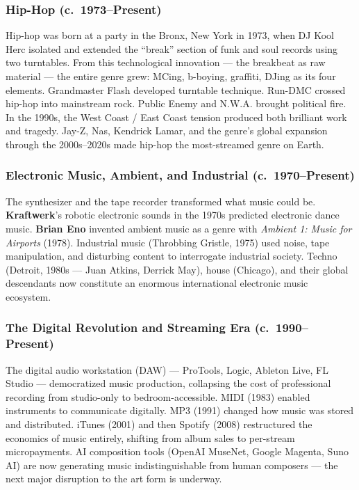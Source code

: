 \documentclass[11pt,letterpaper]{article}
\begin{document}
\subsubsection{Hip-Hop (c.~1973--Present)}

Hip-hop was born at a party in the Bronx, New York in 1973, when DJ Kool Herc isolated and extended the ``break'' section of funk and soul records using two turntables. From this technological innovation --- the breakbeat as raw material --- the entire genre grew: MCing, b-boying, graffiti, DJing as its four elements. Grandmaster Flash developed turntable technique. Run-DMC crossed hip-hop into mainstream rock. Public Enemy and N.W.A. brought political fire. In the 1990s, the West Coast / East Coast tension produced both brilliant work and tragedy. Jay-Z, Nas, Kendrick Lamar, and the genre's global expansion through the 2000s--2020s made hip-hop the most-streamed genre on Earth.

\subsubsection{Electronic Music, Ambient, and Industrial (c.~1970--Present)}

The synthesizer and the tape recorder transformed what music could be. \textbf{Kraftwerk}'s robotic electronic sounds in the 1970s predicted electronic dance music. \textbf{Brian Eno} invented ambient music as a genre with \emph{Ambient 1: Music for Airports} (1978). Industrial music (Throbbing Gristle, 1975) used noise, tape manipulation, and disturbing content to interrogate industrial society. Techno (Detroit, 1980s --- Juan Atkins, Derrick May), house (Chicago), and their global descendants now constitute an enormous international electronic music ecosystem.

\subsubsection{The Digital Revolution and Streaming Era (c.~1990--Present)}

The digital audio workstation (DAW) --- ProTools, Logic, Ableton Live, FL Studio --- democratized music production, collapsing the cost of professional recording from studio-only to bedroom-accessible. MIDI (1983) enabled instruments to communicate digitally. MP3 (1991) changed how music was stored and distributed. iTunes (2001) and then Spotify (2008) restructured the economics of music entirely, shifting from album sales to per-stream micropayments. AI composition tools (OpenAI MuseNet, Google Magenta, Suno AI) are now generating music indistinguishable from human composers --- the next major disruption to the art form is underway.
\end{document}
